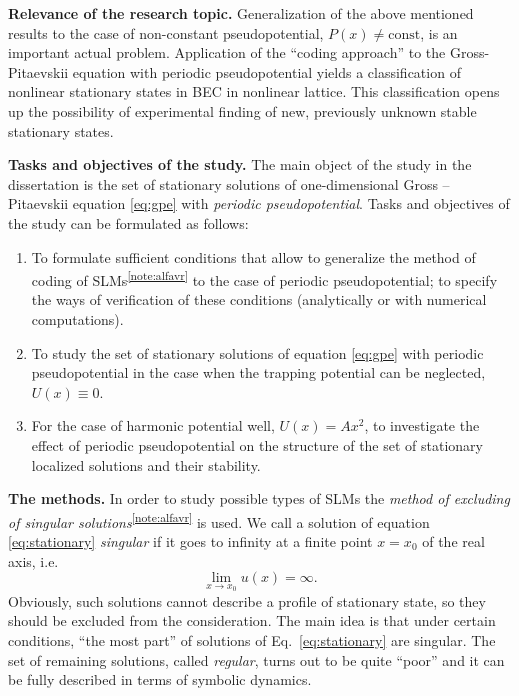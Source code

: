 \documentclass[candidate, href, colorlinks]{disser}
\begin{document}
\textbf{Relevance of the research topic.}
Generalization of the above mentioned results to the case of non-constant pseudopotential, $P(x) \neq \mathrm{const}$, is an important actual problem.
Application of the ``coding approach'' to the Gross-Pitaevskii equation with periodic pseudopotential yields  a classification of nonlinear stationary states in BEC in nonlinear lattice.
This classification opens up the possibility of experimental finding of new, previously unknown stable stationary states.

\textbf{Tasks and objectives of the study.}
The main object of the study in the dissertation is the set of stationary solutions of one-dimensional Gross -- Pitaevskii equation \eqref{eq:gpe} with {\it periodic pseudopotential}.
Tasks and objectives of the study can be formulated as follows:
\begin{enumerate}
	\item To formulate sufficient conditions that allow to generalize the method of coding of SLMs\textsuperscript{\ref{note:alfavr}} to the case of periodic pseudopotential; to specify the ways of verification of these conditions (analytically or with numerical computations).
	\item To study the set of stationary solutions of equation \eqref{eq:gpe} with periodic pseudopotential in the case when the trapping potential can be neglected, $U(x) \equiv 0$.
	\item For the case of harmonic potential well, $U(x) = A x^2$, to investigate the effect of periodic pseudopotential on the structure of the set of stationary localized solutions and their stability.
\end{enumerate}

\textbf{The methods.}
In order to study possible types of SLMs the {\it method of excluding of singular solutions}\textsuperscript{\ref{note:alfavr}} is used.
We call a solution of equation \eqref{eq:stationary} {\it singular} if it goes to infinity at a finite point $x = x_0$ of the real axis, i.e.
\begin{equation}
	\lim \limits_{x \to x_0} u(x) = \infty.
\end{equation}
Obviously, such solutions cannot describe a profile of stationary state, so they should be excluded from the consideration.
The main idea is that under certain conditions, ``the most part'' of solutions of Eq.~\eqref{eq:stationary} are singular.
The set of remaining solutions, called {\it regular}, turns out to be quite ``poor'' and it can be fully described in terms of symbolic dynamics.
\end{document}
